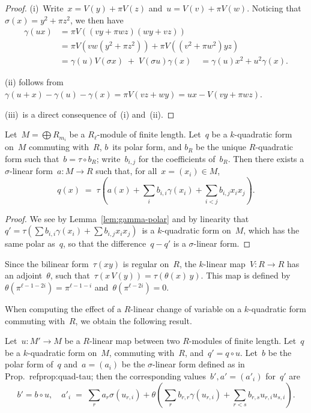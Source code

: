 \documentclass{article}%
\def\pa#1{\left(#1\right)}
\begin{document}
\begin{proof}
(i)~Write~$x = V(y) + π V(z)$ and~$u = V(v) + π V(w)$. Noticing
that~$σ(x) = y^2 + π z^2$, we then have
\begin{equation}\label{eq:gamma-prod}
\begin{split}
γ(ux) &= π V\pa{(vy + π wz)(wy+vz)}\\
 &= π V\pa{vw (y^2 + π z^2)} + π V \pa{(v^2+πw^2) yz}\\
 &= γ(u) V(σx) \;+\; V(σu) γ(x) \quad = γ(u) x^2 + u^2 γ(x).
\end{split}
\end{equation}

(ii) follows from
$γ(u+x) - γ(u) - γ(x) = π V(vz + wy) = ux - V(vy+πwz)$.

(iii)~is a direct consequence of~(i) and~(ii).
\end{proof}%
\begin{prop}\label{prop:quad-tau}%
Let~$M = ⨁ R_{m_i}$ be a $R_ℓ$-module of finite length.
Let~$q$ be a $k$-quadratic form on~$M$ commuting with~$R$, $b$~its
polar form, and $b_R$ be the unique $R$-quadratic form such that~$b = τ ∘
b_R$; write~$b_{i,j}$ for the coefficients of~$b_R$.
Then there exists a $σ$-linear form~$a: M → R$ such that, for all~$x =
(x_i) ∈ M$,
\begin{equation}
q(x) \;=\; τ\pa{a(x) + ∑_{i} b_{i,i} γ(x_i) + ∑_{i < j} b_{i,j} x_i x_j}.
\end{equation}
\end{prop}

\begin{proof}
We see by Lemma~\ref{lem:gamma-polar} and by linearity that
$q' = τ(∑ b_{i,i} γ(x_i) + ∑ b_{i,j} x_i x_j)$~is a $k$-quadratic form on~$M$,
which has the same polar as~$q$,
so that the difference~$q - q'$ is a $σ$-linear form.
\end{proof}%

Since the bilinear form~$τ(x y)$ is regular on~$R$, the $k$-linear
map~$V: R → R$ has an adjoint~$θ$, such that~$τ(x\, V(y)) = τ(θ(x)\, y)$.
This map is defined by~$θ(π^{ℓ-1-2i}) = π^{ℓ-1-i}$ and~$θ(π^{ℓ-2i}) = 0$.

When computing the effect of a $R$-linear change of variable on a
$k$-quadratic form commuting with~$R$, we obtain the following result.

\begin{prop}\label{prop:quad-changevar}%
Let~$u: M' → M$ be a $R$-linear map between two $R$-modules of finite length.
Let~$q$ be a $k$-quadratic form on~$M$, commuting with~$R$, and~$q' = q ∘ u$.
Let~$b$ be the polar form of~$q$ and~$a = (a_i)$ be the $σ$-linear form defined
as in Prop.~ref{prop:quad-tau}; then the corresponding values~$b', a' =
(a'_i)$
for~$q'$ are
\begin{equation*}
b' = b ∘ u, \quad
a'_i \;=\; ∑_r a_r σ(u_{r,i})
  + θ \pa{ ∑_r b_{r,r} γ(u_{r,i}) + ∑_{r < s} b_{r,s} u_{r,i} u_{s,i} }.
\end{equation*}
\end{prop}%
\end{document}
